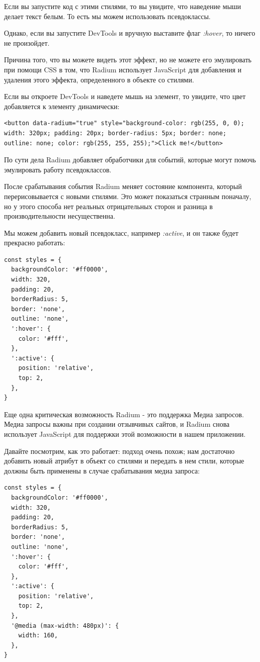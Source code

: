 Если вы запустите код с этими стилями, то вы увидите, что наведение мыши делает текст белым. То есть мы можем использовать псевдоклассы.

Однако, если вы запустите DevTools и вручную выставите флаг \textit{:hover}, то ничего не произойдет.

Причина того, что вы можете видеть этот эффект, но не можете его эмулировать при помощи CSS в том, что Radium использует JavaScript для добавления и удаления этого эффекта, определенного в объекте со стилями.

Если вы откроете DevTools и наведете мышь на элемент, то увидите, что цвет добавляется к элементу динамически:

\begin{lstlisting}
<button data-radium="true" style="background-color: rgb(255, 0, 0); width: 320px; padding: 20px; border-radius: 5px; border: none; outline: none; color: rgb(255, 255, 255);">Click me!</button>
\end{lstlisting}

По сути дела Radium добавляет обработчики для событий, которые могут помочь эмулировать работу псевдоклассов.

После срабатывания события Radium меняет состояние компонента, который перерисовывается с новыми стилями. Это может показаться странным поначалу, но у этого способа нет реальных отрицательных сторон и разница в производительности несущественна. 

Мы можем добавить новый псевдокласс, например \textit{:active}, и он также будет прекрасно работать:

\begin{lstlisting}
const styles = {
  backgroundColor: '#ff0000',
  width: 320,
  padding: 20,
  borderRadius: 5,
  border: 'none',
  outline: 'none',
  ':hover': {
    color: '#fff',
  },
  ':active': {
    position: 'relative',
    top: 2,
  }, 
}
\end{lstlisting}

Еще одна критическая возможность Radium - это поддержка Медиа запросов. Медиа запросы важны при создании отзывчивых сайтов, и Radium снова использует JavaScript для поддержки этой возможности в нашем приложении.

Давайте посмотрим, как это работает: подход очень похож; нам достаточно добавить новый атрибут в объект со стилями и передать в нем стили, которые должны быть применены в случае срабатывания медиа запроса:

\begin{lstlisting}
const styles = {
  backgroundColor: '#ff0000',
  width: 320,
  padding: 20,
  borderRadius: 5,
  border: 'none',
  outline: 'none',
  ':hover': {
    color: '#fff',
  },
  ':active': {
    position: 'relative',
    top: 2,
  },
  '@media (max-width: 480px)': {
    width: 160,
  },
}
\end{lstlisting}

